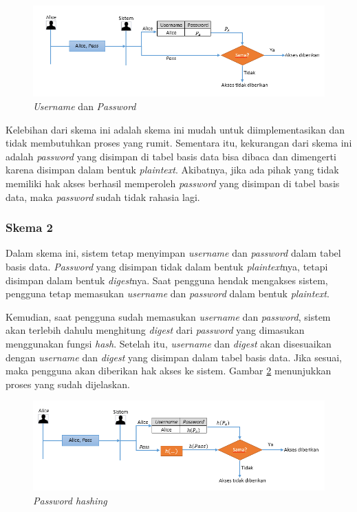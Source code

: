 \begin{figure}[H]
	\includegraphics[scale=0.7]{Gambar/password_1}
	\centering
	\caption{\textit{Username} dan \textit{Password}}\label{fig:password1}
\end{figure}

Kelebihan dari skema ini adalah skema ini mudah untuk diimplementasikan dan tidak membutuhkan proses yang rumit. Sementara itu, kekurangan dari skema ini adalah \textit{password} yang disimpan di tabel basis data bisa dibaca dan dimengerti karena disimpan dalam bentuk \textit{plaintext}. Akibatnya, jika ada pihak yang tidak memiliki hak akses berhasil memperoleh \textit{password} yang disimpan di tabel basis data, maka \textit{password} sudah tidak rahasia lagi.

\subsubsection{Skema 2}

Dalam skema ini, sistem tetap menyimpan \textit{username} dan \textit{password} dalam tabel basis data. \textit{Password} yang disimpan tidak dalam bentuk \textit{plaintext}nya, tetapi disimpan dalam bentuk \textit{digest}nya. Saat pengguna hendak mengakses sistem, pengguna tetap memasukan \textit{username} dan \textit{password} dalam bentuk \textit{plaintext}.

Kemudian, saat pengguna sudah memasukan \textit{username} dan \textit{password}, sistem akan terlebih dahulu menghitung \textit{digest} dari \textit{password} yang dimasukan menggunakan fungsi \textit{hash}. Setelah itu, \textit{username} dan \textit{digest} akan disesuaikan dengan \textit{username} dan \textit{digest} yang disimpan dalam tabel basis data. Jika sesuai, maka pengguna akan diberikan hak akses ke sistem. Gambar \ref{fig:password2} menunjukkan proses yang sudah dijelaskan.

\begin{figure}[H]
	\includegraphics[scale=0.7]{Gambar/password_2}
	\centering
	\caption{\textit{Password hashing}}\label{fig:password2}
\end{figure}

